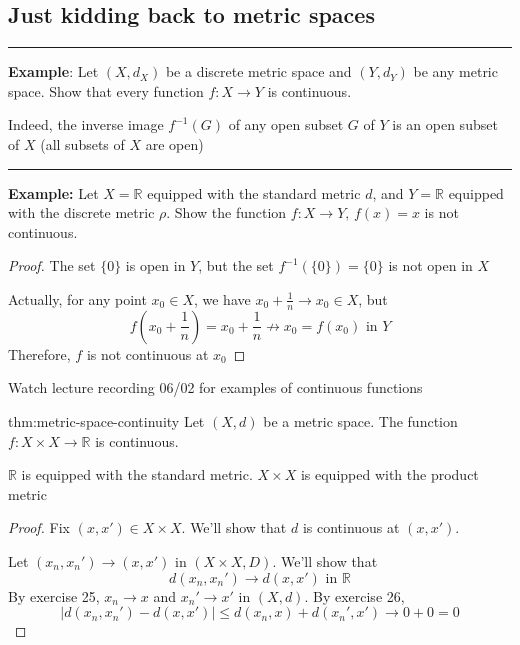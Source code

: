\documentclass{article}
\begin{document}
\subsection{Just kidding back to metric spaces}

\noindent\rule{\textwidth}{0.2pt}
\textbf{Example}: Let $(X, d_{X})$ be a discrete metric space and $(Y, d_{Y})$ be any metric space. Show that every function $f : X \to Y$ is continuous.

Indeed, the inverse image $f^{-1}(G)$ of any open subset $G$ of $Y$ is an open subset of $X$ (all subsets of $X$ are open)

\noindent\rule{\textwidth}{0.2pt}

\textbf{Example: }Let $X = \mathbb{R}$ equipped with the standard metric $d$, and $Y = \mathbb{R}$ equipped with the discrete metric $\rho$. Show the function $f : X \to Y,\, f(x) = x$ is not continuous.

\begin{proof}
    The set $\{0\}$ is open in $Y$, but the set $f^{-1}(\{0\}) = \{0\}$ is not open in $X$

    Actually, for any point $x_{0}\in X$, we have $x_{0} + \frac{1}{n}\to x_{0}\in X$, but
    \[f\left(x_{0} + \frac{1}{n}\right) = x_{0} + \frac{1}{n} \not\to x_{0} = f(x_{0}) \text{ in } Y\]
    Therefore, $f$ is not continuous at $x_{0}$
\end{proof}

Watch lecture recording 06/02 for examples of continuous functions



\begin{thm}{thm:metric-space-continuity}{}
    Let $(X, d)$ be a metric space. The function $f: X \times X \to \mathbb{R} $ is continuous.

    $\mathbb{R}$ is equipped with the standard metric. $X \times X$ is equipped with the product metric
\end{thm}

\begin{proof}
    Fix $(x, x')\in X \times X$. We'll show that $d$ is continuous at $(x, x')$.

    Let $(x_{n}, x_{n}')\to (x, x')$ in $(X \times X, D)$. We'll show that
    \[d(x_{n}, x_{n}')\to d(x,x') \text{ in } \mathbb{R}\]
    By exercise 25, $x_{n}\to x$ and $x_{n}' \to x'$ in $(X, d)$. By exercise 26, 
    \[\lvert d(x_{n}, x_{n}') - d(x,x') \rvert \le d(x_{n},x) + d(x_{n}', x')\to 0 + 0 = 0\]
\end{proof}
\end{document}
